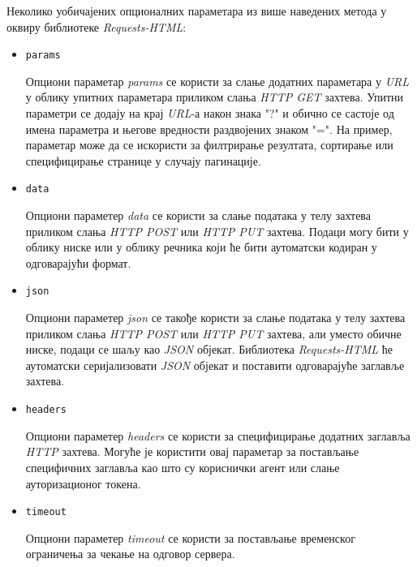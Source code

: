 \documentclass[12pt,oneside]{memoir}
\begin{document}
Неколико уобичајених опционалних параметара из више наведених метода у оквиру библиотеке \textit{Requests-HTML}:
\begin{itemize}
    \item \begin{verbatim}params\end{verbatim} 
        Опциони параметар \textit{params} се користи за слање додатних параметара у \textit{URL} у облику упитних параметара приликом слања \textit{HTTP GET} захтева. Упитни параметри се додају на крај \textit{URL}-а након знака "?" и обично се састоје од имена параметра и његове вредности раздвојених знаком "=". На пример, параметар може да се искористи за филтрирање резултата, сортирање или специфицирање странице у случају пагинације. 
    \item \begin{verbatim}data\end{verbatim} 
        Опциони параметер \textit{data} се користи за слање података у телу захтева приликом слања \textit{HTTP POST} или \textit{HTTP PUT} захтева. Подаци могу бити у облику ниске или у облику речника који ће бити аутоматски кодиран у одговарајући формат.
    \item \begin{verbatim}json\end{verbatim} 
        Опциони параметер \textit{json} се такође користи за слање података у телу захтева приликом слања \textit{HTTP POST} или \textit{HTTP PUT} захтева, али уместо обичне ниске, подаци се шаљу као \textit{JSON} објекат. Библиотека  \textit{Requests-HTML} ће аутоматски серијализовати \textit{JSON} објекат и поставити одговарајуће заглавље захтева.
    \item \begin{verbatim}headers\end{verbatim} 
        Опциони параметер \textit{headers} се користи за специфицирање додатних заглавља \textit{HTTP} захтева. Могуће је користити овај параметар за постављање специфичних заглавља као што су кориснички агент или слање ауторизационог токена.
    \item \begin{verbatim}timeout\end{verbatim} 
        Опциони параметер \textit{timeout} се користи за постављање временског ограничења за чекање на одговор сервера.
\end{itemize}
\end{document}
